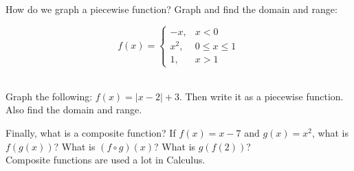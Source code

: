 \documentclass[11pt]{article}
\begin{document}
    \vspace{2ex}

    \newpage

    \noindent How do we graph a piecewise function? Graph and find the domain and range:\\[1ex]

    \begin{minipage}[b]{0.5\textwidth}
        \[f(x) =
            \begin{cases}
                -x,  & x < 0         \\
                x^2, & 0 \le x \le 1 \\
                1,   & x > 1
            \end{cases}
        \]

        \vspace{1ex}
    \end{minipage}
    \begin{minipage}[c]{0.5\textwidth}
        \centering
        \emptygraph
    \end{minipage}\\[2ex]

    \noindent Graph the following: $\displaystyle f(x) = |x - 2| + 3$. Then write it as a piecewise function. Also find the domain and range.\\[1ex]

    \emptygraph

    \vspace{2ex}

    \noindent Finally, what is a composite function? If $\displaystyle f(x) = x - 7$ and $\displaystyle g(x) = x^2$, what is $\displaystyle f(g(x))$? What is $\displaystyle (f \circ g)(x)$? What is $\displaystyle g(f(2))$?\\[2ex]

    \noindent Composite functions are used a lot in Calculus.\\[2ex]
\end{document}
